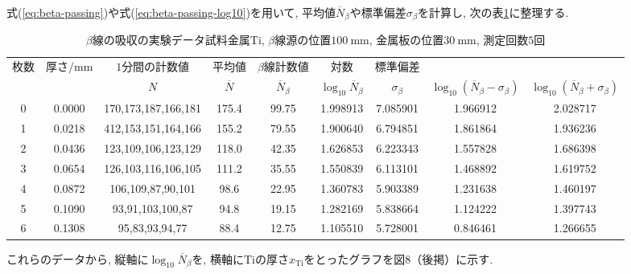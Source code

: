 \documentclass{jarticle}
\begin{document}
式(\ref{eq:beta-passing})や式(\ref{eq:beta-passing-log10})を用いて, 平均値$\overline{N}_\beta$や標準偏差$\sigma_\beta$を計算し, 次の表\ref{tb:absorption-Ti}に整理する.

\begin{table}[H]
  \caption{$\beta$線の吸収の実験データ\protect\linebreak 試料金属$\mathrm{Ti}$, $\beta$線源の位置$100\ \mathrm{mm}$, 金属板の位置$30\ \mathrm{mm}$, 測定回数$5$回}
  \label{tb:absorption-Ti}
  \small
  \hspace{-3.3cm}
  \begin{tabular}{ccccccccc}
    \hline
    枚数 & 厚さ$/\mathrm{mm}$ & $1$分間の計数値 & 平均値 & $\beta$線計数値 & 対数 & 標準偏差 & & \\
    & & $N$ & $\overline{N}$ & $\overline{N}_\beta$ & $\log_{10} \overline{N}_\beta$ & $\sigma_\beta$ & $\log_{10} (\overline{N}_\beta - \sigma_\beta)$ & $\log_{10} (\overline{N}_\beta + \sigma_\beta)$ \\
    \hline
    0 & 0.0000 & 170,173,187,166,181 & 175.4 & 99.75 & 1.998913 & 7.085901 & 1.966912 & 2.028717 \\
    1 & 0.0218 & 412,153,151,164,166 & 155.2 & 79.55 & 1.900640 & 6.794851 & 1.861864 & 1.936236 \\
    2 & 0.0436 & 123,109,106,123,129 & 118.0 & 42.35 & 1.626853 & 6.223343 & 1.557828 & 1.686398 \\
    3 & 0.0654 & 126,103,116,106,105 & 111.2 & 35.55 & 1.550839 & 6.113101 & 1.468892 & 1.619752 \\
    4 & 0.0872 & 106,109,87,90,101 & 98.6 & 22.95 & 1.360783 & 5.903389 & 1.231638 & 1.460197 \\
    5 & 0.1090 & 93,91,103,100,87 & 94.8 & 19.15 & 1.282169 & 5.838664 & 1.124222 & 1.397743 \\
    6 & 0.1308 & 95,83,93,94,77 & 88.4 & 12.75 & 1.105510 & 5.728001 & 0.846461 & 1.266655 \\
    \hline
  \end{tabular}
\end{table}

これらのデータから, 縦軸に$\log_{10}\overline{N}_\beta$を, 横軸に$\mathrm{Ti}$の厚さ$x_\mathrm{Ti}$をとったグラフを図8（後掲）に示す.

\end{document}
